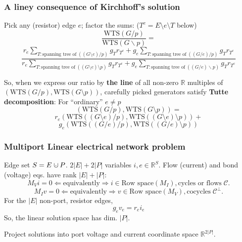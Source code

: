 \documentclass{beamer}
\newcommand{\dunion}
{\mbox{\hbox{\hskip0.45em$\cdot$\hskip-0.44em$\cup$\hskip0.2em}}}
\newcommand{\Reals}{\ensuremath{\mathbb{R}}}
\begin{document}
\begin{frame}
\frametitle{A liney consequence of Kirchhoff's solution}
Pick any (resistor) edge $e$; factor the sums:
($T^c = E\setminus e \setminus T$ below)
\[
\frac{\mbox{WTS}(G/p)}
{\mbox{WTS}(G\backslash p)} 
=
\]
\[
\frac{r_e\sum_{T:\text{spanning tree of}\;((G\setminus e)/p)}g_Tr_{T^c}   
+g_e\sum_{T:\text{spanning tree of}\;((G/e)/p)}g_Tr_{T^c}   }
{r_e\sum_{T:\text{spanning tree of}\;((G\setminus e)\setminus p)}g_Tr_{T^c}
+g_e\sum_{T:\text{spanning tree of}\;((G/e)\backslash p)}g_Tr_{T^c}
}
\]

So, when we express our ratio by \textbf{the line} of all non-zero $\Reals$ 
multiples of $(\mbox{WTS}(G/p),\mbox{WTS}(G\setminus p))$, carefully picked 
generators satisfy \textbf{Tutte decomposition}: For 
``ordinary'' $e\neq p$
\[
(\mbox{WTS}(G/p),\mbox{WTS}(G\setminus p))
=
\]
\[
r_e(\mbox{WTS}((G\setminus e)/p),\mbox{WTS}((G\setminus e)\setminus p))
+
\]
\[
g_e(\mbox{WTS}((G/e)/p),\mbox{WTS}((G/e)\setminus p))
\]

\end{frame}

\begin{frame}
\frametitle{Multiport Linear electrical network problem}


Edge set $S= E\dunion P$. $2|E|+2|P|$ variables $i,e\in \Reals^S$.  
Flow (current) and bond (voltage) eqs. have rank 
$|E|+|P|$:
\[
M_Vi = 0 \Leftarrow\text{equivalently}\Rightarrow i\in\text{Row space}{(M_I)},
\text{cycles or flows}\;\mathcal{C}.
\]
\[
M_Iv = 0 \Leftarrow\text{equivalently}\Rightarrow v\in\text{Row space}{(M_V)},
\text{cocycles}\;\mathcal{C}^{\perp}.
\]
For the $|E| $ non-port, resistor edges,
\[
g_ev_e = r_ei_e
\]
So, the linear solution space has dim. $|P|$.

Project solutions into port voltage and current coordinate space $\Reals^{2|P|}$.

\end{frame}
\end{document}

